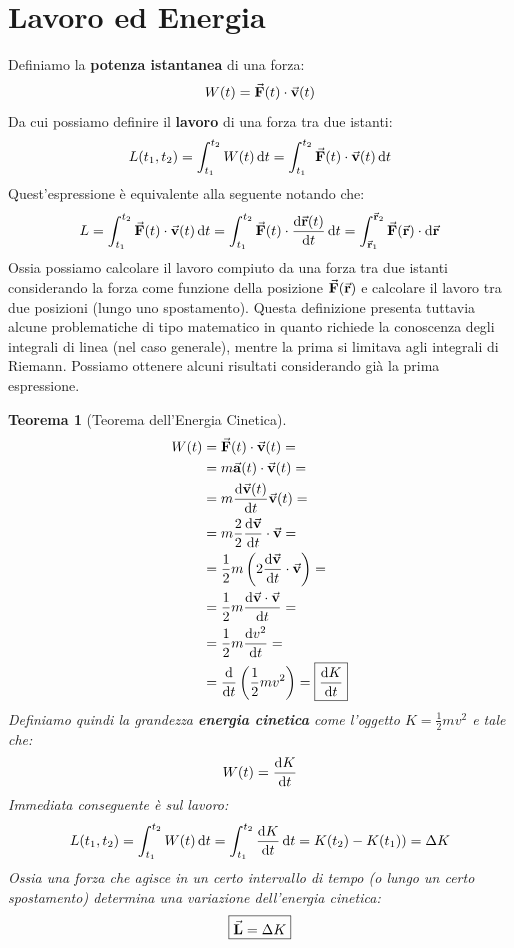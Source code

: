 \documentclass{report}
\newtheorem{thm}{Teorema}[section]
\renewcommand{\a}{\va{a}}
\renewcommand{\v}{\va{v}}
\renewcommand{\r}{\va{r}}
\newcommand{\F}{\va{F}}
\renewcommand{\L}{\va{L}}
\begin{document}
\section{Lavoro ed Energia}
Definiamo la \textbf{potenza istantanea} di una forza:
\begin{equation}
    W(t)=\F(t)\cdot\v(t)
\end{equation}
Da cui possiamo definire il \textbf{lavoro} di una forza tra due istanti:
\begin{equation}
    L(t_1,t_2)=\int_{t_1}^{t_2}W(t)\dif t=\int_{t_1}^{t_2}\F(t)\cdot\v(t)\dif t
\end{equation}
Quest'espressione è equivalente alla seguente notando che:
\begin{equation}
    L=\int_{t_1}^{t_2}\F(t)\cdot\v(t)\dif t=\int_{t_1}^{t_2}\F(t)\cdot\dv{\r(t)}{t}\dif t=\int_{\r_1}^{\r_2}\F(\r)\cdot\dif\r
\end{equation}
Ossia possiamo calcolare il lavoro compiuto da una forza tra due istanti considerando la forza come funzione della posizione $\F(\r)$ e calcolare il lavoro tra due posizioni (lungo uno spostamento). Questa definizione presenta tuttavia alcune problematiche di tipo matematico in quanto richiede la conoscenza degli integrali di linea (nel caso generale), mentre la prima si limitava agli integrali di Riemann. \hypertarget{ForzeVive}{Possiamo ottenere alcuni risultati considerando già la prima espressione.}
\begin{thm}[Teorema dell'Energia Cinetica]
\begin{equation}
\begin{split}
    W(t)&=\F(t)\cdot\v(t)=\\
    &=m\a(t)\cdot\v(t)=\\
    &=m\dv{\v(t)}{t}\v(t)=\\
    &=m\frac{2}{2}\dv{\v}{t}\cdot\v=\\
    &=\frac{1}{2}m\left(2\dv{\v}{t}\cdot\v\right)=\\
    &=\frac{1}{2}m\dv{\v\cdot\v}{t}=\\
    &=\frac{1}{2}m\dv{v^2}{t}=\\
    &=\dv{t}\left(\frac{1}{2}mv^2\right)=\boxed{\dv{K}{t}}
\end{split}
\end{equation}
Definiamo quindi la grandezza \textbf{energia cinetica} come l'oggetto $K=\frac{1}{2}mv^2$ e tale che:
\[W(t)=\dv{K}{t}\]
Immediata conseguente è sul lavoro:
\[L(t_1,t_2)=\int_{t_1}^{t_2}W(t)\dif t=\int_{t_1}^{t_2}\dv{K}{t}\dif t=K(t_2)-K(t_1))=\Delta K\]
Ossia una forza che agisce in un certo intervallo di tempo (o lungo un certo spostamento) determina una variazione dell'energia cinetica:
\[\boxed{\L=\Delta K}\]
\end{thm}
\end{document}
